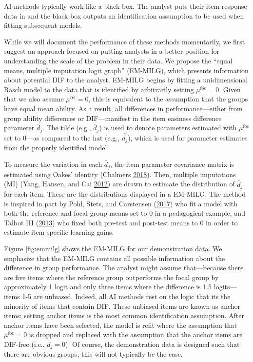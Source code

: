 \documentclass[
  11pt,
]{article}
\begin{document}
AI methods typically work like a black box. The analyst puts their item response data in and the black box outputs an identification assumption to be used when fitting subsequent models.

While we will document the performance of these methods momentarily, we first suggest an approach focused on putting analysts in a better position for understanding the scale of the problem in their data. We propose the \enquote{equal means, multiple imputation logit graph} (EM-MILG), which presents information about potential DIF to the analyst. EM-MILG begins by fitting a unidimensional Rasch model to the data that is identified by arbitrarily setting \(\mu^\text{foc} = 0\). Given that we also assume \(\mu^\text{ref} = 0\), this is equivalent to the assumption that the groups have equal mean ability. As a result, all differences in performance---either from group ability differences or DIF---manifest in the item easiness difference parameter \(\tilde{d_j}\). The tilde (e.g., \(\tilde{d_j}\)) is used to denote parameters estimated with \(\mu^\text{foc}\) set to \(0\)---as compared to the hat (e.g., \(\hat{d_j}\)), which is used for parameter estimates from the properly identified model.

To measure the variation in each \(\tilde{{d_j}}\), the item parameter covariance matrix is estimated using Oakes' identity (Chalmers \protect\hyperlink{ref-chalmers2018numerical}{2018}). Then, multiple imputations (MI) (Yang, Hansen, and Cai \protect\hyperlink{ref-yang2012characterizing}{2012}) are drawn to estimate the distribution of \(\tilde{d_j}\) for each item. These are the distributions displayed in a EM-MILG. The method is inspired in part by Pohl, Stets, and Carstensen (\protect\hyperlink{ref-pohl2017cluster}{2017}) who fit a model with both the reference and focal group means set to 0 in a pedagogical example, and Talbot III (\protect\hyperlink{ref-talbot2013taking}{2013}) who fixed both pre-test and post-test means to 0 in order to estimate item-specific learning gains.

Figure \ref{fig:emmilg} shows the EM-MILG for our demonstration data. We emphasize that the EM-MILG contains all possible information about the difference in group performance. The analyst might assume that---because there are five items where the reference group outperforms the focal group by approximately 1 logit and only three items where the difference is 1.5 logits---items 1-5 are unbiased. Indeed, all AI methods rest on the logic that its the minority of items that contain DIF. These unbiased items are known as anchor items; setting anchor items is the most common identification assumption. After anchor items have been selected, the model is refit where the assumption that \(\mu^\text{foc} = 0\) is dropped and replaced with the assumption that the anchor items are DIF-free (i.e., \(d_j = 0\)). Of course, the demonstration data is designed such that there are obvious groups; this will not typically be the case.
\end{document}
